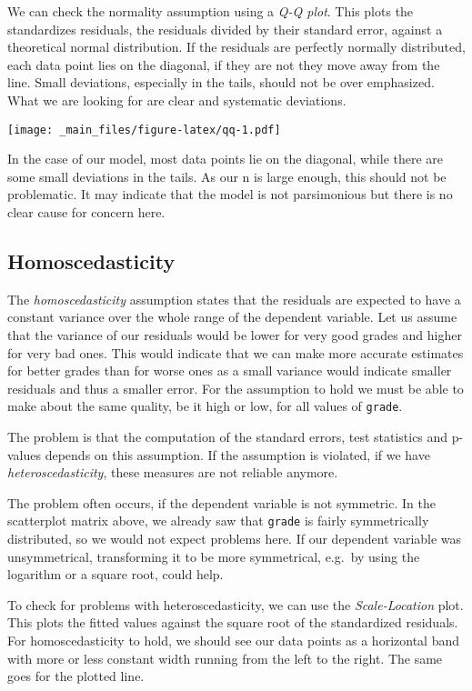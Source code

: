 \documentclass[
]{book}
\begin{document}
We can check the normality assumption using a \emph{Q-Q plot}. This plots the
standardizes residuals, the residuals divided by their standard error, against
a theoretical normal distribution. If the residuals are perfectly normally
distributed, each data point lies on the diagonal, if they are not they move
away from the line. Small deviations, especially in the tails, should not be
over emphasized. What we are looking for are clear and systematic deviations.

\texttt{[image: \_main\_files/figure-latex/qq-1.pdf]}

In the case of our model, most data points lie on the diagonal, while there are
some small deviations in the tails. As our n is large enough, this should not be
problematic. It may indicate that the model is not parsimonious but there is
no clear cause for concern here.

\hypertarget{homoscedasticity}{%
\subsection{Homoscedasticity}\label{homoscedasticity}}

The \emph{homoscedasticity} assumption states that the residuals are expected to have
a constant variance over the whole range of the dependent variable. Let us
assume that the variance of our residuals would be lower for very good grades
and higher for very bad ones. This would indicate that we can make more accurate
estimates for better grades than for worse ones as a small variance would
indicate smaller residuals and thus a smaller error. For the assumption to hold
we must be able to make about the same quality, be it high or low, for all
values of \texttt{grade}.

The problem is that the computation of the standard errors, test statistics and
p-values depends on this assumption. If the assumption is violated, if we have
\emph{heteroscedasticity}, these measures are not reliable anymore.

The problem often occurs, if the dependent variable is not symmetric. In the
scatterplot matrix above, we already saw that \texttt{grade} is fairly symmetrically
distributed, so we would not expect problems here. If our dependent variable was
unsymmetrical, transforming it to be more symmetrical, e.g.~by using the
logarithm or a square root, could help.

To check for problems with heteroscedasticity, we can use the \emph{Scale-Location}
plot. This plots the fitted values against the square root of the standardized
residuals. For homoscedasticity to hold, we should see our data points as a
horizontal band with more or less constant width running from the left to the
right. The same goes for the plotted line.
\end{document}
